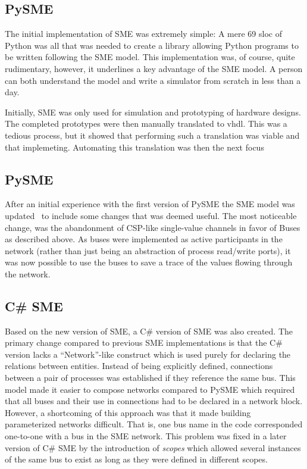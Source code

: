 \subsection{ PySME}

The initial implementation of SME was extremely simple: A mere 69 \gls{sloc} of
Python was all that was needed to create a library allowing Python programs to
be written following the SME model. This implementation was, of course, quite
rudimentary, however, it underlines a key advantage of the SME model. A person
can both understand the model and write a simulator from scratch in less than a
day.

Initially, SME was only used for simulation and prototyping of hardware
designs. The completed prototypes were then manually translated to
\gls{vhdl}. This was a tedious process, but it showed that performing such a
translation was viable and that implemeting. Automating this translation was
then the next focus


\subsection{ PySME}
After an initial experience with the first version of PySME the SME model was
updated~\cite{vinter2015bus} to include some changes that was deemed useful. The
most noticeable change, was the abandonment of CSP-like single-value channels in
favor of Buses as described above. As buses were implemented as active
participants in the network (rather than just being an abstraction of process
read/write ports), it was now possible to use the buses to save a trace of the
values flowing through the network.

\subsection{C\# SME}
Based on the new version of SME, a C\# version of SME was also created. The
primary change compared to previous SME implementations is that the C\# version
lacks a ``Network''-like construct which is used purely for declaring the
relations between entities. Instead of being explicitly defined, connections
between a pair of processes was established if they reference the same bus. This
model made it easier to compose networks compared to PySME which required that
all buses and their use in connections had to be declared in a network
block. However, a shortcoming of this approach was that it made building
parameterized networks difficult. That is, one bus name in the code corresponded
one-to-one with a bus in the SME network. This problem was fixed in a later
version of C\# SME by the introduction of {\itshape scopes} which allowed
several instances of the same bus to exist as long as they were defined in
different scopes.

